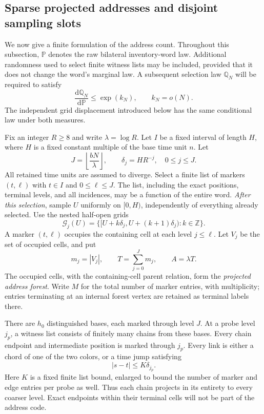 \subsection{Sparse projected addresses and disjoint sampling slots}

We now give a finite formulation of the address count.  Throughout this
subsection, $\mathbb P$ denotes the raw bilateral inventory-word law.
Additional randomness used to select finite witness lists may be included,
provided that it does not change the word's marginal law.  A subsequent
selection law $\mathbb Q_N$ will be required to satisfy
\begin{equation}\label{arm:address-tilt}
 \frac{\mathrm d\mathbb Q_N}{\mathrm d\mathbb P}
 \leq \exp(k_N),\qquad k_N=o(N).
\end{equation}
The independent grid displacement introduced below has the same conditional
law under both measures.

\begin{definition}\label{arm:address-forest}
Fix an integer $R\geq8$ and write $\lambda=\log R$.  Let $I$ be a
fixed interval of length $H$, where $H$ is a fixed constant multiple of the
base time unit $n$.  Let
\[
 J=\left\lfloor\frac{bN}{\lambda}\right\rfloor,
 \qquad \delta_j=H R^{-j},\quad 0\leq j\leq J.
\]
All retained time units are assumed to diverge.  Select a finite list of
markers $(t,\ell)$ with $t\in I$ and $0\leq\ell\leq J$.  The list,
including the exact positions, terminal levels, and all incidences, may
be a function of the entire word.  \emph{After this selection}, sample
$U$ uniformly on $[0,H)$, independently of everything already selected.
Use the nested half-open grids
\[
 \mathcal G_j(U)=
 \big\{[U+k\delta_j,U+(k+1)\delta_j):k\in\mathbb Z\big\}.
\]
A marker $(t,\ell)$ occupies the containing cell at each level $j\leq\ell$.
Let $V_j$ be the set of occupied cells, and put
\[
 m_j=|V_j|,\qquad T=\sum_{j=0}^Jm_j,
 \qquad A=\lambda T.
\]
The occupied cells, with the containing-cell parent relation, form the
\emph{projected address forest}.  Write $M$ for the total number of marker
entries, with multiplicity; entries terminating at an internal forest
vertex are retained as terminal labels there.

There are $h_0$ distinguished bases, each marked through level $J$.
At a probe level $j_p$, a witness list consists of finitely many chains
from these bases.  Every chain endpoint and intermediate position is
marked through $j_p$.  Every link is either a chord of one of the two
colors, or a time jump satisfying
\[
 |s-t|\leq K\delta_{j_p}.
\]
Here $K$ is a fixed finite list bound, enlarged to bound the number of
marker and edge entries per probe as well.  Thus each chain projects in
its entirety to every coarser level.  Exact endpoints within their
terminal cells will not be part of the address code.
\end{definition}

